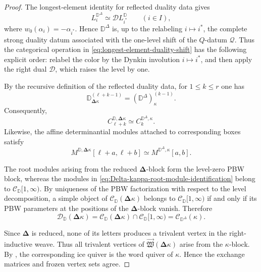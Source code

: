 \documentclass[12pt, reqno]{amsart}
\theoremstyle{plain}
\theoremstyle{definition}
\numberwithin{equation}{section}
\newcommand{\DD}{\mathbb{D}}
\begin{document}
\begin{proof}
The longest-element identity for reflected duality data gives
\begin{equation}\label{eq:longest-element-duality-shift}
    L_i^{\DD^\Delta}
    \simeq
    \mathcal D L_{i^*}^{\DD}
    \qquad(i\in I),
\end{equation}
where \(w_0(\alpha_i)=-\alpha_{i^*}\). Hence
\(\DD^\Delta\) is, up to the relabeling \(i\mapsto i^*\), the
complete strong duality datum associated with the one-level shift of
the \(Q\)-datum \(\mathcal Q\).
Thus the categorical operation in
\eqref{eq:longest-element-duality-shift} has the following explicit
order: relabel the color by the Dynkin involution
\(i\mapsto i^*\), and then apply the right dual \(\mathcal D\),
which raises the level by one.

By the recursive definition of the reflected duality data, for
\(1\leq k\leq r\) one has
\[
    \DD_{\boldsymbol{\Delta}\kappa}^{(\ell+k-1)}
    =
    (\DD^\Delta)_\kappa^{(k-1)}.
\]
Consequently,
\begin{equation}\label{eq:Delta-kappa-root-module-identification}
    C_{\ell+k}^{\DD,\boldsymbol{\Delta}\kappa}
    \simeq
    C_k^{\DD^\Delta,\kappa}.
\end{equation}
Likewise, the affine determinantial modules attached to corresponding
boxes satisfy
\begin{equation}\label{eq:Delta-kappa-determinantial-identification}
    M^{\DD,\boldsymbol{\Delta}\kappa}
        [\ell+a,\ell+b]
    \simeq
    M^{\DD^\Delta,\kappa}[a,b].
\end{equation}

The root modules arising from the reduced
\(\boldsymbol{\Delta}\)-block form the level-zero PBW block, whereas
the modules in
\eqref{eq:Delta-kappa-root-module-identification} belong to
\(\mathscr C_{\DD}[1,\infty)\). By uniqueness of the PBW
factorization with respect to the level decomposition, a simple
object of
\(\mathscr C_{\DD}(\boldsymbol{\Delta}\kappa)\) belongs to
\(\mathscr C_{\DD}[1,\infty)\) if and only if its PBW parameters at
the positions of the \(\boldsymbol{\Delta}\)-block vanish. Therefore
\[
    \mathscr D_{\DD}(\boldsymbol{\Delta}\kappa)
    =
    \mathscr C_{\DD}(\boldsymbol{\Delta}\kappa)
      \cap\mathscr C_{\DD}[1,\infty)
    =
    \mathscr C_{\DD^\Delta}(\kappa).
\]

Since \(\boldsymbol{\Delta}\) is reduced, none of its letters produces
a trivalent vertex in the right-inductive weave. Thus all trivalent
vertices of
\(\overrightarrow{\mathfrak W}
(\boldsymbol{\Delta}\kappa)\)
arise from the \(\kappa\)-block. By
\cite[Corollary~4.45]{casals2025cluster}, the corresponding ice
quiver is the word quiver of \(\kappa\). Hence the exchange matrices
and frozen vertex sets agree.


\end{proof}
\end{document}

